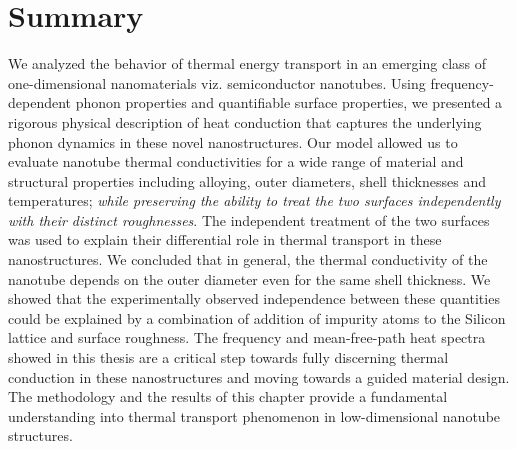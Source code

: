 \section{Summary}
We analyzed the behavior of thermal energy transport in an emerging class of one-dimensional nanomaterials viz. semiconductor nanotubes. Using frequency-dependent phonon properties and quantifiable surface properties, we presented a rigorous physical description of heat conduction that captures the underlying phonon dynamics in these novel nanostructures. Our model allowed us to evaluate nanotube thermal conductivities for a wide range of material and structural properties including alloying, outer diameters, shell thicknesses and temperatures; \emph{while preserving the ability to treat the two surfaces independently with their distinct roughnesses}. The independent treatment of the two surfaces was used to explain their differential role in thermal transport in these nanostructures. We concluded that in general, the thermal conductivity of the nanotube depends on the outer diameter even for the same shell thickness. We showed that the experimentally observed independence between these quantities could be explained by a combination of addition of impurity atoms to the Silicon lattice and surface roughness. The frequency and mean-free-path heat spectra showed in this thesis are a critical step towards fully discerning thermal conduction in these nanostructures and moving towards a guided material design. The methodology and the results of this chapter provide a fundamental understanding into thermal transport phenomenon in low-dimensional nanotube structures.





